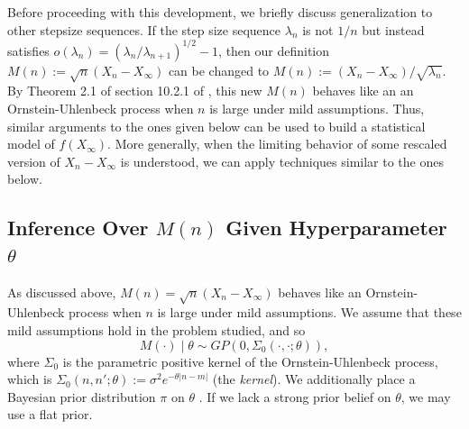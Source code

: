 \documentclass{wscpaperproc}
\newcommand{\pfcomment}[1]{{\color{red} PF: #1}}
\theoremstyle{wsc}
\begin{document}
Before proceeding with this development, we briefly discuss generalization to other stepsize sequences. If the step size sequence $\lambda_{n}$ is not $1/n$ but instead satisfies $o(\lambda_{n}) = (\lambda_{n}/\lambda_{n+1})^{1/2}-1$, then our definition $M(n):=\sqrt{n}(X_{n}-X_{\infty})$ can be changed to $M(n):=(X_{n}-X_{\infty})/ \sqrt{\lambda_{n}}$.  By Theorem 2.1 of section 10.2.1 of , this new $M(n)$ behaves like an an Ornstein-Uhlenbeck process when $n$ is large under mild assumptions. Thus, similar arguments to the ones given below can be used to build a statistical model of $f(X_\infty)$.  More generally, when the limiting behavior of some rescaled version of $X_n - X_\infty$ is understood, we can apply techniques similar to the ones below.




\subsection{Inference Over $M(n)$ Given Hyperparameter $\theta$}
\label{sec:SGD-GP-1}

As discussed above, 
$M(n)=\sqrt{n}\left(X_{n}-X_{\infty}\right)$ behaves like an Ornstein-Uhlenbeck process when $n$ is large under mild assumptions.
We assume that these mild assumptions hold in the problem studied, and so 
\[
M(\cdot) \mid \theta\sim GP\left(0,\Sigma_{0}\left(\cdot,\cdot; \theta\right)\right),
\]
where $\Sigma_{0}$ is the parametric positive kernel of the Ornstein-Uhlenbeck process, which is $\Sigma_{0}(n,n';\theta):=\sigma^{2}e^{-\theta\left|n-m\right|}$ (the {\it kernel}). 
We additionally place a Bayesian prior distribution $\pi$ on $\theta$ \cite{Neal:GPBayesian}. If we lack a strong prior belief on $\theta$, we may use a flat prior.
\end{document}

